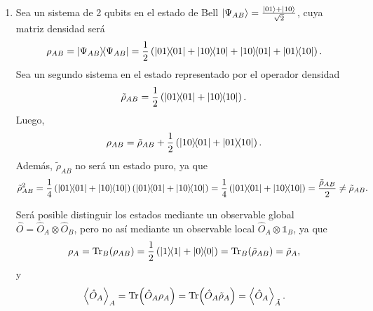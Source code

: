 \documentclass{scrartcl}
\newcommand{\inv}[1]{\frac{1}{#1}}
\DeclareRobustCommand{\[}{\begin{equation}}
\DeclareRobustCommand{\]}{\end{equation}}
\begin{document}
\begin{enumerate}
    
    
    \item Sea un sistema de 2 qubits en el estado de Bell $\ket{\Psi_{AB}} = \frac{\ket{01} + \ket{10}}{\sqrt{2}}$, cuya matriz densidad será
    \[ \rho_{AB} = \dyad{\Psi_{AB}}{\Psi_{AB}} = \inv{2} \left( \dyad{01}{01} + \dyad{10}{10} + \dyad{10}{01} + \dyad{01}{10} \right). \]
    Sea un segundo sistema en el estado representado por el operador densidad
    \[ \tilde{\rho}_{AB} = \inv{2} \left( \dyad{01}{01} + \dyad{10}{10} \right). \]
    Luego,
    \[ \rho_{AB} = \tilde{\rho}_{AB} + \inv{2} \left( \dyad{10}{01} + \dyad{01}{10} \right). \]
    Además, $\tilde{\rho}_{AB}$ no será un estado puro, ya que
    \[ \tilde{\rho}_{AB}^2 = \inv{4} \left( \dyad{01}{01} + \dyad{10}{10} \right) \left( \dyad{01}{01} + \dyad{10}{10} \right) = \inv{4} \left( \dyad{01}{01} + \dyad{10}{10} \right) = \frac{\tilde{\rho}_{AB}}{2} \neq \tilde{\rho}_{AB}. \]
    
    Será posible distinguir los estados mediante un observable global $\hat O = \hat O_A \otimes \hat O_B$, pero no así mediante un observable local $\hat O_A \otimes \mathds{1}_B$, ya que
    \[ \rho_A = \Tr_B(\rho_{AB}) = \inv{2} \left( \dyad{1}{1} + \dyad{0}{0} \right) =\Tr_B(\tilde{\rho}_{AB}) = \tilde{\rho}_A, \]
    y
    \[ \expval{\hat O_A}_A = \Tr(\hat O_A \rho_A) = \Tr(\hat O_A \tilde{\rho}_A) = \expval{\hat O_A}_{\tilde{A}}. \]
    
\end{enumerate}



\end{document}
